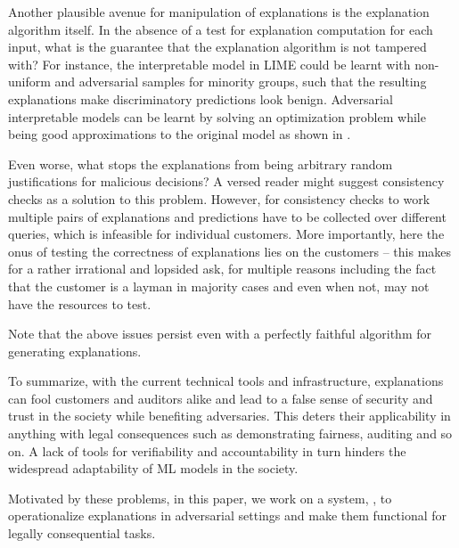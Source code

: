 Another plausible avenue for manipulation of explanations is the explanation algorithm itself. In the absence of a test for explanation computation for each input, what is the guarantee that the explanation algorithm is not tampered with? For instance, the interpretable model in LIME could be learnt with non-uniform and adversarial samples for minority groups, such that the resulting explanations make discriminatory predictions look benign. Adversarial interpretable models can be learnt by solving an optimization problem while being good approximations to the original model as shown in \cite{shahin2022washing}.

Even worse, what stops the explanations from being arbitrary random justifications for malicious decisions? A versed reader might suggest consistency checks as a solution to this problem\cite{}. However, for consistency checks to work multiple pairs of explanations and predictions have to be collected over different queries, which is infeasible for individual customers. More importantly, here the onus of testing the correctness of explanations lies on the customers -- this makes for a rather irrational and lopsided ask, for multiple reasons including the fact that the customer is a layman in majority cases and even when not, may not have the resources to test.

Note that the above issues persist even with a perfectly faithful algorithm for generating explanations.


To summarize, with the current technical tools and infrastructure, explanations can fool customers and auditors alike and lead to a false sense of security and trust in the society while benefiting adversaries. This deters their applicability in anything with legal consequences such as demonstrating fairness, auditing \cite{yadav2022xaudit} and so on. A lack of tools for verifiability and accountability in turn hinders the widespread adaptability of ML models in the society.


Motivated by these problems, in this paper, we work on a system, \name, to operationalize explanations in adversarial settings and make them functional for legally consequential tasks.


